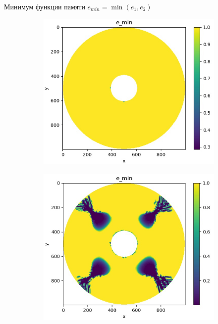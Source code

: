 \documentclass{beamer}
\begin{document}
\begin{frame}{Минимум функции памяти $e_{min} = \min(e_1,e_2)$}
\begin{figure}[H]
	\centering
	\begin{subfigure}[H]{0.4\textwidth}
		\includegraphics[width=\textwidth]{e_06tf}
	\end{subfigure}
	\qquad\qquad
	\begin{subfigure}[H]{0.4\textwidth}
		\includegraphics[width=\textwidth]{e_002}
	\end{subfigure}	

\end{figure}
\end{frame}
\end{document}
